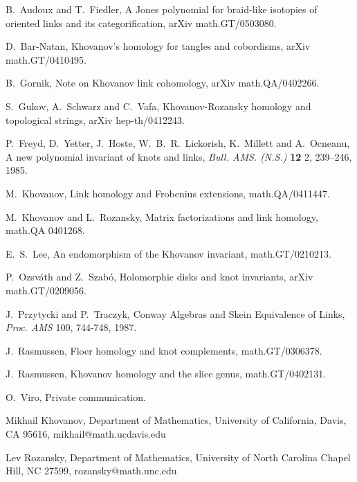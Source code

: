 \documentclass[12pt]{article}
\begin{document}
\noindent 
[AF] B.~Audoux and T.~Fiedler, A Jones polynomial for braid-like 
isotopies of oriented links and its categorification, arXiv math.GT/0503080. 

\noindent 
[BN] D.~Bar-Natan, Khovanov's homology for tangles and cobordisms, 
arXiv math.GT/0410495. 

\noindent 
[G] B.~Gornik, Note on Khovanov link cohomology, arXiv 
 math.QA/0402266.  

\noindent
[GSV] S.~Gukov, A.~Schwarz and C.~Vafa, Khovanov-Rozansky homology 
and topological strings, arXiv hep-th/0412243. 

\noindent 
[HOMFLY] P.~Freyd, D.~Yetter, J.~Hoste, W.~B.~R.~Lickorish, 
K.~Millett and A.~Ocneanu, A new polynomial invariant of knots 
and links, \emph{Bull. AMS. (N.S.)} {\bf 12} 2, 239--246, 1985. 

\noindent 
[K] M.~Khovanov, Link homology and Frobenius extensions, 
math.QA/0411447. 

\noindent
[KR] M.~Khovanov and L.~Rozansky, Matrix factorizations and
link homology, math.QA 0401268. 

\noindent
[L] E.~S.~Lee, An endomorphism of the Khovanov invariant, 
 math.GT/0210213. 

\noindent 
[OS] P.~Ozsv\'ath and Z.~Szab\'o, Holomorphic disks and 
knot invariants, arXiv math.GT/0209056. 

\noindent
[PT] J.~Przytycki and P.~Traczyk, Conway Algebras and 
Skein Equivalence of Links, \emph{ Proc. AMS}  100, 744-748, 1987.

\noindent
[R1] J.~Rasmussen, Floer homology and knot complements, 
math.GT/0306378. 

\noindent
[R2] J.~Rasmussen, Khovanov homology and the slice genus, 
math.GT/0402131. 

\noindent 
[V] O.~Viro, Private communication. 

\vspace{0.2in} 

\noindent 
Mikhail Khovanov, Department of Mathematics, University of California,
Davis, CA 95616, mikhail@math.ucdavis.edu
 
\vspace{0.07in}
 
\noindent 
Lev Rozansky, Department of Mathematics, University of North Carolina
Chapel Hill, NC 27599, rozansky@math.unc.edu
\end{document}
